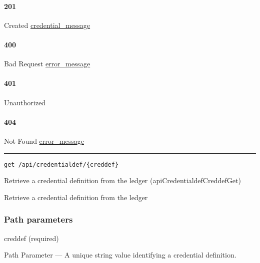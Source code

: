 \hypertarget{section-199}{%
\paragraph{201}\label{section-199}}

Created \protect\hyperlink{credential_message}{credential\_message}

\hypertarget{section-200}{%
\paragraph{400}\label{section-200}}

Bad Request \protect\hyperlink{error_message}{error\_message}

\hypertarget{section-201}{%
\paragraph{401}\label{section-201}}

Unauthorized \protect\hyperlink{}{}

\hypertarget{section-202}{%
\paragraph{404}\label{section-202}}

Not Found \protect\hyperlink{error_message}{error\_message}

\begin{center}\rule{0.5\linewidth}{\linethickness}\end{center}

\protect\hypertarget{apiCredentialdefCreddefGet}{}{}

\begin{verbatim}
get /api/credentialdef/{creddef}
\end{verbatim}

Retrieve a credential definition from the ledger
({apiCredentialdefCreddefGet})

Retrieve a credential definition from the ledger

\hypertarget{path-parameters-31}{%
\subsubsection{Path parameters}\label{path-parameters-31}}

creddef (required)

{Path Parameter} --- A unique string value identifying a credential
definition.

